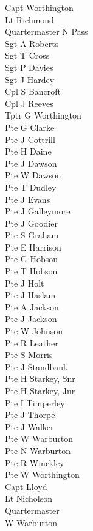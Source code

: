 \begin{multicols}{3}
  \small
  \noindent
  Capt Worthington \\
  Lt Richmond \\
  Quartermaster N Pass \\
  Sgt A Roberts \\
  Sgt T Cross \\
  Sgt P Davies \\
  Sgt J Hardey \\
  Cpl S Bancroft \\
  Cpl J Reeves \\
  Tptr G Worthington \\
  Pte G Clarke \\
  Pte J Cottrill \\
  Pte H Daine \\
  Pte J Dawson \\
  Pte W Dawson \\
  Pte T Dudley \\
  Pte J Evans \\
  Pte J Galleymore \\
  Pte J Goodier \\
  Pte S Graham \\
  Pte E Harrison \\
  Pte G Hobson \\
  Pte T Hobson \\
  Pte J Holt \\
  Pte J Haslam \\
  Pte A Jackson \\
  Pte J Jackson \\
  Pte W Johnson \\
  Pte R Leather \\
  Pte S Morris \\
  Pte J Standbank \\
  Pte H Starkey, Snr \\
  Pte H Starkey, Jnr \\
  Pte I Timperley \\
  Pte J Thorpe \\
  Pte J Walker \\
  Pte W Warburton \\
  Pte N Warburton \\
  Pte R Winckley \\
  Pte W Worthington \\
  Capt Lloyd \\
  Lt Nicholson \\
  Quartermaster \\ \indent W Warburton \\

\end{multicols}
